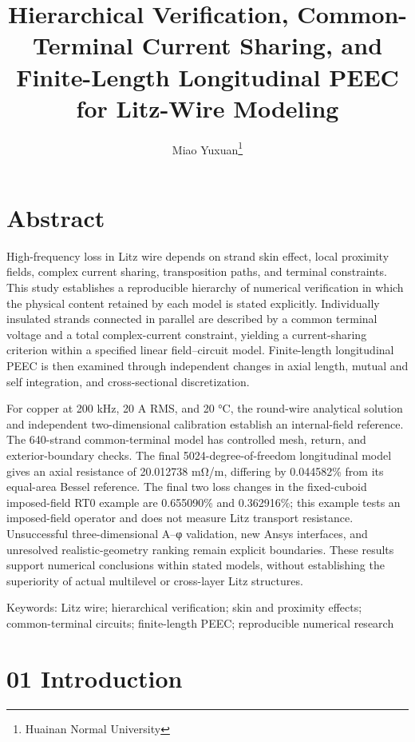 \documentclass[journal,10pt]{IEEEtran}
\begin{document}
\title{Hierarchical Verification, Common-Terminal Current Sharing, and Finite-Length Longitudinal PEEC for Litz-Wire Modeling}
\author{Miao Yuxuan\thanks{Huainan Normal University}}

\maketitle
\FloatBarrier
\section*{Abstract}
\hypertarget{abstract}{}
High-frequency loss in Litz wire depends on strand skin effect, local proximity fields, complex current sharing, transposition paths, and terminal constraints. This study establishes a reproducible hierarchy of numerical verification in which the physical content retained by each model is stated explicitly. Individually insulated strands connected in parallel are described by a common terminal voltage and a total complex-current constraint, yielding a current-sharing criterion within a specified linear field–circuit model. Finite-length longitudinal PEEC is then examined through independent changes in axial length, mutual and self integration, and cross-sectional discretization.

For copper at 200 kHz, 20 A RMS, and 20 °C, the round-wire analytical solution and independent two-dimensional calibration establish an internal-field reference. The 640-strand common-terminal model has controlled mesh, return, and exterior-boundary checks. The final 5024-degree-of-freedom longitudinal model gives an axial resistance of 20.012738 mΩ/m, differing by 0.044582\% from its equal-area Bessel reference. The final two loss changes in the fixed-cuboid imposed-field RT0 example are 0.655090\% and 0.362916\%; this example tests an imposed-field operator and does not measure Litz transport resistance. Unsuccessful three-dimensional A–φ validation, new Ansys interfaces, and unresolved realistic-geometry ranking remain explicit boundaries. These results support numerical conclusions within stated models, without establishing the superiority of actual multilevel or cross-layer Litz structures.


Keywords: Litz wire; hierarchical verification; skin and proximity effects; common-terminal circuits; finite-length PEEC; reproducible numerical research


\FloatBarrier
\section*{01 Introduction}
\hypertarget{chapter-01}{}
\end{document}
